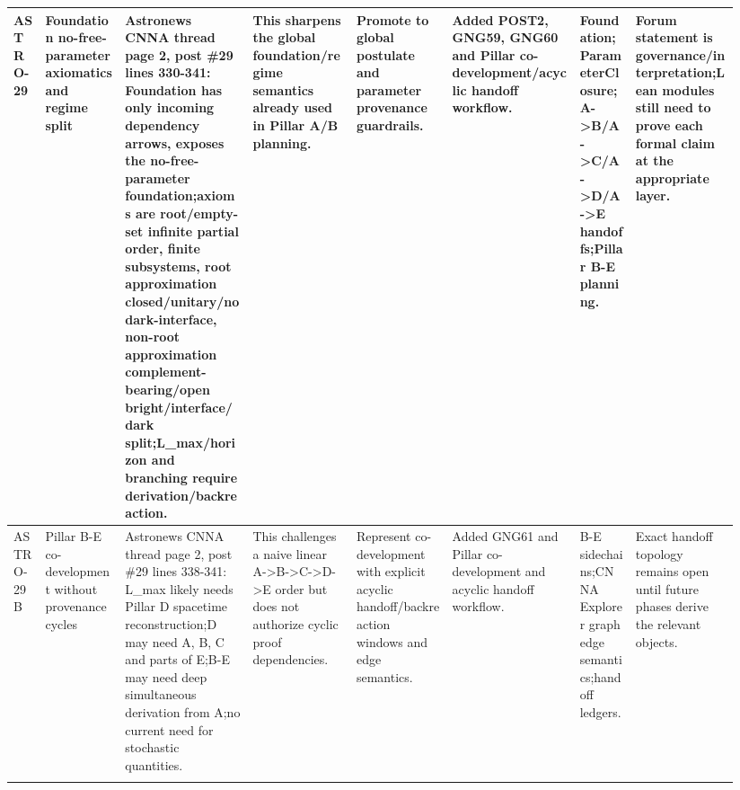 \begin{longtable}{L{0.04\linewidth} L{0.105\linewidth} L{0.16\linewidth} L{0.13\linewidth} L{0.125\linewidth} L{0.165\linewidth} L{0.075\linewidth} L{0.135\linewidth}}
ASTRO-29 & Foundation no-free-parameter axiomatics and regime split & Astronews CNNA thread page 2, post \#29 lines 330-341: Foundation has only incoming dependency arrows, exposes the no-free-parameter foundation;\newline axioms are root/\allowbreak{}empty-set infinite partial order, finite subsystems, root approximation closed/\allowbreak{}unitary/\allowbreak{}no dark-interface, non-root approximation complement-bearing/\allowbreak{}open bright/\allowbreak{}interface/\allowbreak{}dark split;\newline L\_max/\allowbreak{}horizon and branching require derivation/\allowbreak{}backreaction. & This sharpens the global foundation/\allowbreak{}regime semantics already used in Pillar A/\allowbreak{}B planning. & Promote to global postulate and parameter provenance guardrails. & Added POST2, GNG59, GNG60 and Pillar co-development/\allowbreak{}acyclic handoff workflow. & Foundation;\newline ParameterClosure;\newline A->B/\allowbreak{}A->C/\allowbreak{}A->D/\allowbreak{}A->E handoffs;\newline Pillar B-E planning. & Forum statement is governance/\allowbreak{}interpretation;\newline Lean modules still need to prove each formal claim at the appropriate layer.\\
\hline
\addlinespace[0.24em]
ASTRO-29B & Pillar B-E co-development without provenance cycles & Astronews CNNA thread page 2, post \#29 lines 338-341: L\_max likely needs Pillar D spacetime reconstruction;\newline D may need A, B, C and parts of E;\newline B-E may need deep simultaneous derivation from A;\newline no current need for stochastic quantities. & This challenges a naive linear A->B->C->D->E order but does not authorize cyclic proof dependencies. & Represent co-development with explicit acyclic handoff/\allowbreak{}backreaction windows and edge semantics. & Added GNG61 and Pillar co-development and acyclic handoff workflow. & B-E sidechains;\newline CNNA Explorer graph edge semantics;\newline handoff ledgers. & Exact handoff topology remains open until future phases derive the relevant objects.\\
\hline
\addlinespace[0.24em]
\end{longtable}
\normalsize
